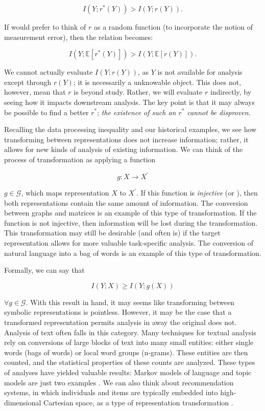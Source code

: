 \[
I(Y; r^*(Y)) > I(Y; r(Y)).
\]

If would prefer to think of $r$ as a random function (to incorporate the notion of measurement error), then the relation becomes:

\[
I(Y; \mathbb{E}[r^*(Y)]) > I(Y; \mathbb{E}[r(Y)]).
\]

We cannot actually evaluate $I(Y; r(Y))$, as $Y$ is not available for analysis except through $r(Y)$; it is necessarily a unknowable object.
This does not, however, mean that $r$ is beyond study.
Rather, we will evaluate $r$ indirectly, by seeing how it impacts downstream analysis.
The key point is that it may always be possible to find a better $r^*$; \textit{the existence of such an $r^*$ cannot be disproven.}

\bigskip

Recalling the data processing inequality and our historical examples, we see how transforming between representations does not increase information; rather, it allows for new kinds of analysis of existing information.
We can think of the process of transformation as applying a function

\[
g: X \rightarrow X^\prime
\]

$g \in \mathcal{G}$, which maps representation $X$ to $X^\prime$.
If this function is \textit{injective} (or ), then both representations contain the same amount of information.
The conversion between graphs and matrices is an example of this type of transformation.
If the function is not injective, then information will be lost during the transformation.
This transformation may still be desirable (and often is) if the target representation allows for more valuable task-specific analysis.
The conversion of natural language into a bag of words is an example of this type of transformation.

Formally, we can say that

\[
I(Y; X) \geq I(Y; g(X))
\]

$\forall g \in \mathcal{G}$. With this result in hand, it may seems like transforming between symbolic representations is pointless.
However, it may be the case that a transformed representation permits analysis in away the original does not.
Analysis of text often falls in this category.
Many techniques for textual analysis rely on conversions of large blocks of text into many small entities: either single words (bags of words) or local word groups (n-grams).
These entities are then counted, and the statistical properties of these counts are analyzed.
These types of analyses have yielded valuable results: Markov models of language and topic models are just two examples \cite{blei}.
We can also think about recommendation systems, in which individuals and items are typically embedded into high-dimensional Cartesian space, as a type of representation transformation \cite{koren}.

